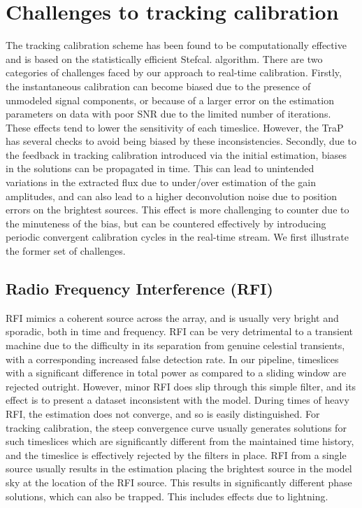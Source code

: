 \documentclass{aa}
\begin{document}
\section{\label{sec:Challenges-to-tracking}Challenges to tracking calibration}

The tracking calibration scheme has been found to be computationally
effective and is based on the statistically efficient Stefcal. algorithm.
There are two categories of challenges faced by our approach to real-time
calibration. Firstly, the instantaneous calibration can become biased
due to the presence of unmodeled signal components, or because of
a larger error on the estimation parameters on data with poor SNR
due to the limited number of iterations. These effects tend to lower
the sensitivity of each timeslice. However, the TraP has several checks
to avoid being biased by these inconsistencies. Secondly, due to the
feedback in tracking calibration introduced via the initial estimation,
biases in the solutions can be propagated in time. This can lead to
unintended variations in the extracted flux due to under/over estimation
of the gain amplitudes, and can also lead to a higher deconvolution
noise due to position errors on the brightest sources. This effect
is more challenging to counter due to the minuteness of the bias,
but can be countered effectively by introducing periodic convergent
calibration cycles in the real-time stream. We first illustrate the
former set of challenges.


\subsection{Radio Frequency Interference (RFI)}

RFI mimics a coherent source across the array, and is usually very
bright and sporadic, both in time and frequency. RFI can be very detrimental
to a transient machine due to the difficulty in its separation from
genuine celestial transients, with a corresponding increased false
detection rate. In our pipeline, timeslices with a significant difference
in total power as compared to a sliding window are rejected outright.
However, minor RFI does slip through this simple filter, and its effect
is to present a dataset inconsistent with the model. During times
of heavy RFI, the estimation does not converge, and so is easily distinguished.
For tracking calibration, the steep convergence curve usually generates
solutions for such timeslices which are significantly different from
the maintained time history, and the timeslice is effectively rejected
by the filters in place. RFI from a single source usually results
in the estimation placing the brightest source in the model sky at
the location of the RFI source. This results in significantly different
phase solutions, which can also be trapped. This includes effects
due to lightning.
\end{document}
